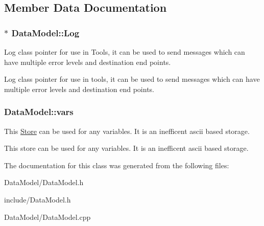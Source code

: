 \subsection{Member Data Documentation}
\hypertarget{classDataModel_a3cb335c70a8fe3f4852dbd96844f9417}{
\subsubsection[{Log}]{ $\ast$ Data\-Model\-::\-Log}}\label{classDataModel_a3cb335c70a8fe3f4852dbd96844f9417}


Log class pointer for use in Tools, it can be used to send messages which can have multiple error levels and destination end points. 

Log class pointer for use in tools, it can be used to send messages which can have multiple error levels and destination end points. \hypertarget{classDataModel_a4baac5fe364a7a23762d70d2c2216486}{
\subsubsection[{vars}]{ Data\-Model\-::vars}}\label{classDataModel_a4baac5fe364a7a23762d70d2c2216486}


This \hyperlink{classStore}{Store} can be used for any variables. It is an inefficent ascii based storage. 

This store can be used for any variables. It is an inefficent ascii based storage. 

The documentation for this class was generated from the following files\-:\begin{DoxyCompactItemize}
\item 
Data\-Model/Data\-Model.\-h\item 
include/Data\-Model.\-h\item 
Data\-Model/Data\-Model.\-cpp\end{DoxyCompactItemize}
